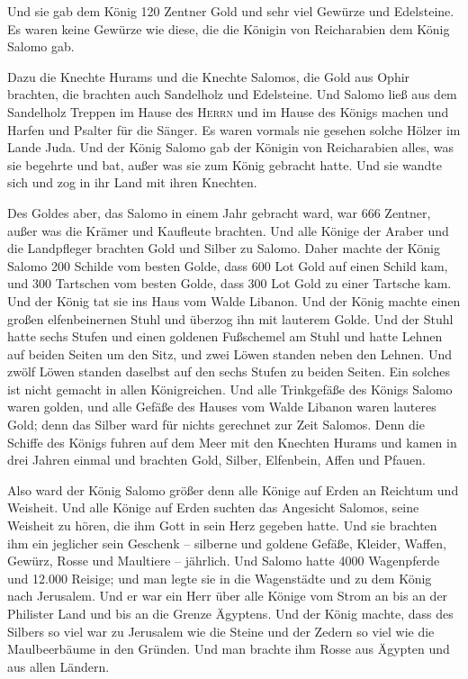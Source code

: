  Und sie gab dem König 120 Zentner Gold und sehr viel
Gewürze und Edelsteine. Es waren keine Gewürze wie diese, die die
Königin von Reicharabien dem König Salomo gab.

 Dazu die Knechte Hurams und die Knechte Salomos, die
Gold aus Ophir brachten, die brachten auch Sandelholz und Edelsteine.
 Und Salomo ließ aus dem Sandelholz Treppen im Hause des
\textsc{Herrn} und im Hause des Königs machen und Harfen und Psalter für
die Sänger. Es waren vormals nie gesehen solche Hölzer im Lande Juda.
 Und der König Salomo gab der Königin von Reicharabien
alles, was sie begehrte und bat, außer was sie zum König gebracht hatte.
Und sie wandte sich und zog in ihr Land mit ihren Knechten.

 Des Goldes aber, das Salomo in einem Jahr gebracht ward,
war 666 Zentner,  außer was die Krämer und Kaufleute
brachten. Und alle Könige der Araber und die Landpfleger brachten Gold
und Silber zu Salomo.  Daher machte der König Salomo 200
Schilde vom besten Golde, dass 600 Lot Gold auf einen Schild kam,
 und 300 Tartschen vom besten Golde, dass 300 Lot Gold zu
einer Tartsche kam.  Und der König tat sie ins Haus vom
Walde Libanon. Und der König machte einen großen elfenbeinernen Stuhl
und überzog ihn mit lauterem Golde.  Und der Stuhl hatte
sechs Stufen und einen goldenen Fußschemel am Stuhl und hatte Lehnen auf
beiden Seiten um den Sitz, und zwei Löwen standen neben den Lehnen.
 Und zwölf Löwen standen daselbst auf den sechs Stufen zu
beiden Seiten. Ein solches ist nicht gemacht in allen Königreichen.
 Und alle Trinkgefäße des Königs Salomo waren golden, und
alle Gefäße des Hauses vom Walde Libanon waren lauteres Gold; denn das
Silber ward für nichts gerechnet zur Zeit Salomos.  Denn
die Schiffe des Königs fuhren auf dem Meer mit den Knechten Hurams und
kamen in drei Jahren einmal und brachten Gold, Silber, Elfenbein, Affen
und Pfauen.

 Also ward der König Salomo größer denn alle Könige auf
Erden an Reichtum und Weisheit.  Und alle Könige auf
Erden suchten das Angesicht Salomos, seine Weisheit zu hören, die ihm
Gott in sein Herz gegeben hatte.  Und sie brachten ihm
ein jeglicher sein Geschenk -- silberne und goldene Gefäße, Kleider,
Waffen, Gewürz, Rosse und Maultiere -- jährlich.  Und
Salomo hatte 4000 Wagenpferde und 12.000 Reisige; und man legte sie in
die Wagenstädte und zu dem König nach Jerusalem.  Und er
war ein Herr über alle Könige vom Strom an bis an der Philister Land und
bis an die Grenze Ägyptens.  Und der König machte, dass
des Silbers so viel war zu Jerusalem wie die Steine und der Zedern so
viel wie die Maulbeerbäume in den Gründen.  Und man
brachte ihm Rosse aus Ägypten und aus allen Ländern.

